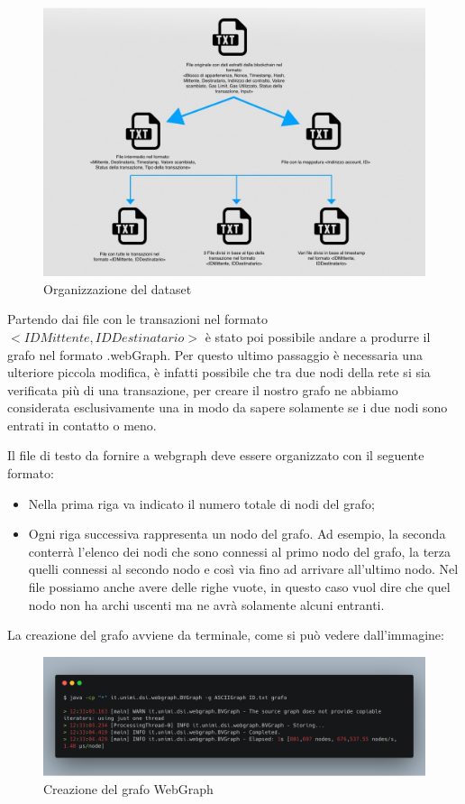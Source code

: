 \documentclass[12pt]{report}
\begin{document}
\begin{figure}[H]
    \includegraphics[width=\textwidth]{MappaFile}
    \caption{Organizzazione del dataset}
\end{figure}


Partendo dai file con le transazioni nel formato $<IDMittente, IDDestinatario>$ è stato poi possibile andare a produrre il grafo nel formato .webGraph.
Per questo ultimo passaggio è necessaria una ulteriore piccola modifica, è infatti possibile che tra due nodi della rete si sia verificata più di una transazione, per creare il nostro grafo ne abbiamo considerata esclusivamente una in modo da sapere solamente se i due nodi sono entrati in contatto o meno.

Il file di testo da fornire a webgraph deve essere organizzato con il seguente formato:
\begin{itemize}
    \item Nella prima riga va indicato il numero totale di nodi del grafo;
    \item Ogni riga successiva rappresenta un nodo del grafo. Ad esempio, la seconda conterrà l'elenco dei nodi che sono connessi al primo nodo del grafo, la terza quelli connessi al secondo nodo e così via fino ad arrivare all'ultimo nodo.
    Nel file possiamo anche avere delle righe vuote, in questo caso vuol dire che quel nodo non ha archi uscenti ma ne avrà solamente alcuni entranti.
\end{itemize}
La creazione del grafo avviene da terminale, come si può vedere dall'immagine:

\begin{figure}[H]
    \includegraphics[width=\textwidth]{carbon-22.png}
    \caption{Creazione del grafo WebGraph}
\end{figure}
\end{document}
